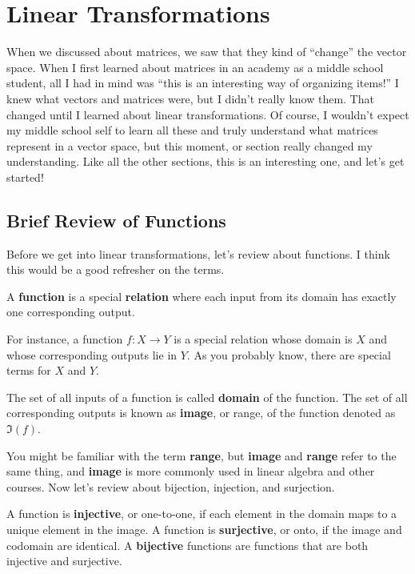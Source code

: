 \documentclass[../../../main.tex]{subfiles}
\begin{document}
\section{Linear Transformations}

When we discussed about matrices, we saw that they kind of ``change''
the vector space. When I first learned about matrices in an academy
as a middle school student, all I had in mind was ``this is an
interesting way of organizing items!'' I knew what vectors and
matrices were, but I didn't really know them. That changed until
I learned about linear transformations. Of course, I wouldn't expect
my middle school self to learn all these and truly understand what
matrices represent in a vector space, but this moment, or section
really changed my understanding. Like all the other sections, this
is an interesting one, and let's get started!

\subsection{Brief Review of Functions}

Before we get into linear transformations, let's review about
functions. I think this would be a good refresher on the terms.

\begin{definition}{}{}
A \textbf{function} is a special \textbf{relation} where each input
from its domain has exactly one corresponding output.
\end{definition}

For instance, a function $f: X \to Y$ is a special relation whose
domain is $X$ and whose corresponding outputs lie in $Y$. As you
probably know, there are special terms for $X$ and $Y$.

\begin{definition}{}{}
The set of all inputs of a function is called \textbf{domain} of the
function. The set of all corresponding outputs is known as
\textbf{image}, or range, of the function denoted as $\Im(f)$.
\end{definition}

You might be familiar with the term \textbf{range}, but \textbf{image}
and \textbf{range} refer to the same thing, and \textbf{image} is
more commonly used in linear algebra and other courses. Now let's
review about bijection, injection, and surjection.

\begin{definition}{}{}
A function is \textbf{injective}, or one-to-one, if each element in
the domain maps to a unique element in the image. A function is
\textbf{surjective}, or onto, if the image and codomain are identical.
A \textbf{bijective} functions are functions that are both injective
and surjective.
\end{definition}
\end{document}
